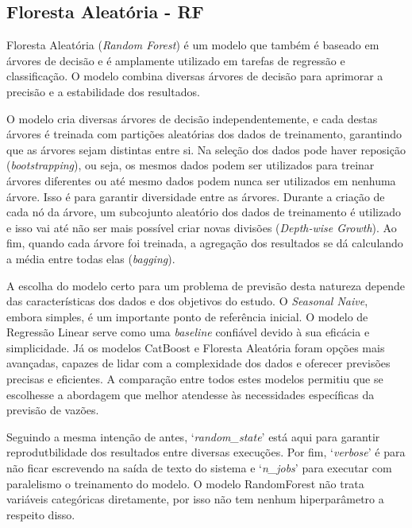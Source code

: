 
\subsection{Floresta Aleatória - RF}

Floresta Aleatória (\textit{Random Forest}) é um modelo que também é baseado em árvores de decisão e é amplamente utilizado em tarefas de regressão e classificação. O modelo combina diversas árvores de decisão para aprimorar a precisão e a estabilidade dos resultados.

O modelo cria diversas árvores de decisão independentemente, e cada destas árvores é treinada com partições aleatórias dos dados de treinamento, garantindo que as árvores sejam distintas entre si. Na seleção dos dados pode haver reposição (\textit{bootstrapping}), ou seja, os mesmos dados podem ser utilizados para treinar árvores diferentes ou até mesmo dados podem nunca ser utilizados em nenhuma árvore. Isso é para garantir diversidade entre as árvores. Durante a criação de cada nó da árvore, um subcojunto aleatório dos dados de treinamento é utilizado e isso vai até não ser mais possível criar novas divisões (\textit{Depth-wise Growth}). Ao fim, quando cada árvore foi treinada, a agregação dos resultados se dá calculando a média entre todas elas (\textit{bagging}).\cite{hasan_ahmed_salman_2024}\cite{sklearn_random_forest_2024}

A escolha do modelo certo para um problema de previsão desta natureza depende das características dos dados e dos objetivos do estudo. O \textit{Seasonal Naive}, embora simples, é um importante ponto de referência inicial. O modelo de Regressão Linear serve como uma \textit{baseline} confiável devido à sua eficácia e simplicidade. Já os modelos CatBoost e Floresta Aleatória foram opções mais avançadas, capazes de lidar com a complexidade dos dados e oferecer previsões precisas e eficientes. A comparação entre todos estes modelos permitiu que se escolhesse a abordagem que melhor atendesse às necessidades específicas da previsão de vazões.

Seguindo a mesma intenção de antes, `\textit{random\_state}' está aqui para garantir reprodutbilidade dos resultados entre diversas execuções. Por fim, `\textit{verbose}' é para não ficar escrevendo na saída de texto do sistema e `\textit{n\_jobs}' para executar com paralelismo o treinamento do modelo. O modelo RandomForest não trata variáveis categóricas diretamente, por isso não tem nenhum hiperparâmetro a respeito disso.

